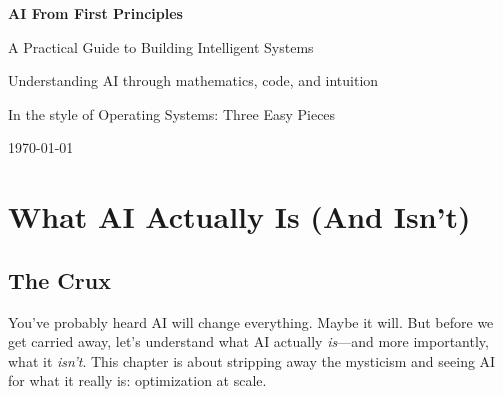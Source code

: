\documentclass[11pt,oneside]{book}
\newcommand{\blankpage}{%
    \clearpage
    \thispagestyle{empty}
    \mbox{}
    \clearpage
}
\begin{document}

\begin{titlepage}
    \centering
    \vspace*{2cm}

    {\Huge\bfseries AI From First Principles\par}
    \vspace{1cm}
    {\Large A Practical Guide to Building Intelligent Systems\par}
    \vspace{2cm}

    {\large Understanding AI through mathematics, code, and intuition\par}

    \vfill

    {\large In the style of Operating Systems: Three Easy Pieces\par}

    \vspace{1cm}

    {\large \today\par}
\end{titlepage}

\blankpage


\tableofcontents
\blankpage





\chapter{What AI Actually Is (And Isn't)}

\section{The Crux}
You've probably heard AI will change everything. Maybe it will. But before we get carried away, let's understand what AI actually \textit{is}---and more importantly, what it \textit{isn't}. This chapter is about stripping away the mysticism and seeing AI for what it really is: optimization at scale.
\end{document}
